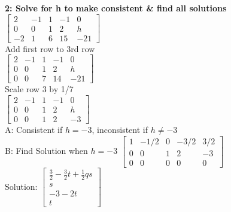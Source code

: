 \documentclass{article}
\begin{document}
\textbf{2: Solve for h to make consistent \& find all solutions}\\[0.05in]
$\left[\begin{array}{cccc|c}
2 & -1 & 1 & -1 & 0 \\
0 & 0 & 1 & 2 & h \\
-2 & 1 & 6 & 15 & -21
\end{array}\right]$
\\[0.05in]Add first row to 3rd row\\[0.05in]
$\left[\begin{array}{cccc|c}
2 & -1 & 1 & -1 & 0 \\
0 & 0 & 1 & 2 & h \\
0 & 0 & 7 & 14 & -21
\end{array}\right]$
\\[0.05in]Scale row 3 by 1/7\\[0.05in]
$\left[\begin{array}{cccc|c}
2 & -1 & 1 & -1 & 0 \\
0 & 0 & 1 & 2 & h \\
0 & 0 & 1 & 2 & -3
\end{array}\right]$\\[0.05in]
A: Consistent if $h=-3$, inconsistent if $h\neq -3$\\
B: Find Solution when $h=-3$
$\left[\begin{array}{cccc|c}
1 & -1/2 & 0 & -3/2 & 3/2 \\
0 & 0 & 1 & 2 & -3 \\
0 & 0 & 0 & 0 & 0
\end{array}\right]$
\\[0.1in]Solution:
$\left[\begin{array}{c}
\frac{3}{2}-\frac{3}{2}t+\frac{1}{2}qs \\
s \\
-3-2t \\
t
\end{array}\right]$
\end{document}
